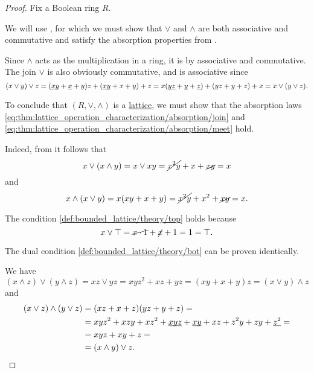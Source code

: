\begin{proof}
  Fix a Boolean ring \( R \).

   We will use , for which we must show that \( {\vee} \) and \( {\wedge} \) are both associative and commutative and satisfy the absorption properties from .

  Since \( {\wedge} \) acts as the multiplication in a ring, it is by associative and commutative. The join \( {\vee} \) is also obviously commutative, and is associative since
  \begin{equation*}
    (x \vee y) \vee z
    =
    (\underline{\smash{xy}} + \underline{\smash{x}} + y)z + (\underline{\smash{xy}} + x + y) + z
    =
    x(\underline{\smash{yz}} + \underline{\smash{y}} + \underline{\smash{z}}) + (yz + y + z) + x
    =
    x \vee (y \vee z).
  \end{equation*}

  To conclude that \( (R, \vee, \wedge) \) is a \hyperref[def:lattice]{lattice}, we must show that the absorption laws \eqref{eq:thm:lattice_operation_characterization/absorption/join} and \eqref{eq:thm:lattice_operation_characterization/absorption/meet} hold.

  Indeed, from  it follows that
  \begin{equation*}
    x \vee (x \wedge y)
    =
    x \vee xy
    =
    \cancel{x^2 y} + x + \cancel{xy}
    =
    x
  \end{equation*}
  and
  \begin{equation*}
    x \wedge (x \vee y)
    =
    x(xy + x + y)
    =
    \cancel{x^2 y} + x^2 + \cancel{xy}
    =
    x.
  \end{equation*}

   The condition \eqref{def:bounded_lattice/theory/top} holds because
  \begin{equation*}
    x \vee \top
    =
    \cancel{x \cdot 1} + \cancel{x} + 1
    =
    1
    =
    \top.
  \end{equation*}

  The dual condition \eqref{def:bounded_lattice/theory/bot} can be proven identically.

   We have
  \begin{equation*}
    (x \wedge z) \vee (y \wedge z)
    =
    xz \vee yz
    =
    xyz^2 + xz + yz
    =
    (xy + x + y)z
    =
    (x \vee y) \wedge z
  \end{equation*}
  and
  \begin{align*}
    (x \vee z) \wedge (y \vee z)
    &=
    (xz + x + z)(yz + y + z)
    = \\ &=
    xyz^2 + xzy + xz^2 + \underline{\smash{xyz}} + \underline{\smash{xy}} + xz + z^2y + zy + \underline{\smash{z^2}}
    = \\ &=
    xyz + xy + z
    = \\ &=
    (x \wedge y) \vee z.
  \end{align*}


\end{proof}
